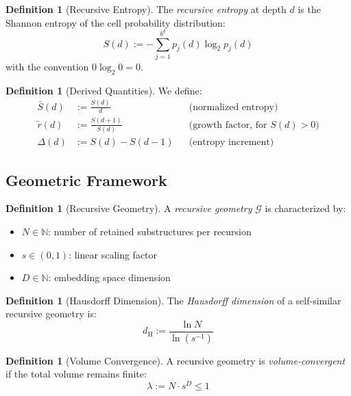 \documentclass[11pt,a4paper]{article}
\theoremstyle{definition}
\newtheorem{definition}[theorem]{Definition}
\theoremstyle{remark}
\newcommand{\N}{\mathbb{N}}
\newcommand{\dH}{d_{\mathrm{H}}}
\newcommand{\Sbar}{\bar{S}}
\newcommand{\rtilde}{\tilde{r}}
\begin{document}
\begin{definition}[Recursive Entropy]
\label{def:recursive_entropy}
The \emph{recursive entropy} at depth $d$ is the Shannon entropy of the cell probability distribution:
\begin{equation}
    S(d) := -\sum_{j=1}^{b^d} p_j(d) \log_2 p_j(d)
    \label{eq:rec_entropy}
\end{equation}
with the convention $0 \log_2 0 = 0$.
\end{definition}

\begin{definition}[Derived Quantities]
\label{def:derived}
We define:
\begin{align}
    \Sbar(d) &:= \frac{S(d)}{d} && \text{(normalized entropy)} \label{eq:sbar} \\
    \rtilde(d) &:= \frac{S(d+1)}{S(d)} && \text{(growth factor, for } S(d) > 0\text{)} \label{eq:rtilde} \\
    \Delta(d) &:= S(d) - S(d-1) && \text{(entropy increment)} \label{eq:delta}
\end{align}
\end{definition}

\subsection{Geometric Framework}

\begin{definition}[Recursive Geometry]
\label{def:recursive_geometry}
A \emph{recursive geometry} $\mathcal{G}$ is characterized by:
\begin{itemize}[nosep]
    \item $N \in \N$: number of retained substructures per recursion
    \item $s \in (0,1)$: linear scaling factor
    \item $D \in \N$: embedding space dimension
\end{itemize}
\end{definition}

\begin{definition}[Hausdorff Dimension]
\label{def:hausdorff}
The \emph{Hausdorff dimension} of a self-similar recursive geometry is:
\begin{equation}
    \dH := \frac{\ln N}{\ln(s^{-1})}
    \label{eq:hausdorff}
\end{equation}
\end{definition}

\begin{definition}[Volume Convergence]
\label{def:volume_convergence}
A recursive geometry is \emph{volume-convergent} if the total volume remains finite:
\begin{equation}
    \lambda := N \cdot s^D \leq 1
    \label{eq:lambda}
\end{equation}
\end{definition}
\end{document}
